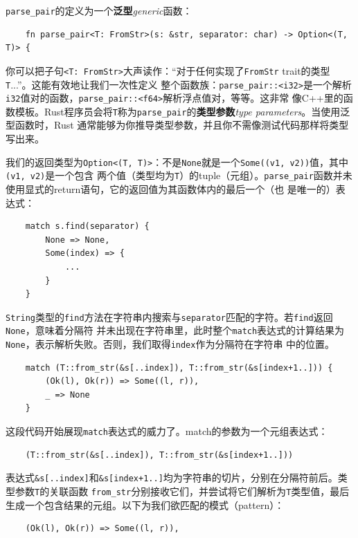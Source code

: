 \smallskip
\texttt{parse\_pair}的定义为一个\textbf{泛型}\textit{generic}函数：
\begin{verbatim}
    fn parse_pair<T: FromStr>(s: &str, separator: char) -> Option<(T, T)> {
\end{verbatim}

\smallskip
你可以把子句\texttt{<T: FromStr>}大声读作：“对于任何实现了\texttt{FromStr} trait的类型\texttt{T}...”。这能有效地让我们一次性定义
整个函数族：\texttt{parse\_pair::<i32>}是一个解析\texttt{i32}值对的函数，\texttt{parse\_pair::<f64>}解析浮点值对，等等。这非常
像C++里的函数模板。Rust程序员会将\texttt{T}称为\texttt{parse\_pair}的\textbf{类型参数}\textit{type parameters}。当使用泛型函数时，Rust
通常能够为你推导类型参数，并且你不需像测试代码那样将类型写出来。

\medskip
我们的返回类型为\texttt{Option<(T, T)>}：不是\texttt{None}就是一个\texttt{Some((v1, v2))}值，其中\texttt{(v1, v2)}是一个包含
两个值（类型均为\texttt{T}）的tuple（元组）。\texttt{parse\_pair}函数并未使用显式的return语句，它的返回值为其函数体内的最后一个（也
是唯一的）表达式：
\begin{verbatim}
    match s.find(separator) {
        None => None,
        Some(index) => {
            ...
        }
    }
\end{verbatim}

\smallskip
\texttt{String}类型的\texttt{find}方法在字符串内搜索与\texttt{separator}匹配的字符。若\texttt{find}返回\texttt{None}，意味着分隔符
并未出现在字符串里，此时整个\texttt{match}表达式的计算结果为\texttt{None}，表示解析失败。否则，我们取得\texttt{index}作为分隔符在字符串
中的位置。
\begin{verbatim}
    match (T::from_str(&s[..index]), T::from_str(&s[index+1..])) {
        (Ok(l), Ok(r)) => Some((l, r)),
        _ => None
    }
\end{verbatim}

\smallskip
这段代码开始展现\texttt{match}表达式的威力了。match的参数为一个元组表达式：
\begin{verbatim}
    (T::from_str(&s[..index]), T::from_str(&s[index+1..]))
\end{verbatim}

\smallskip
表达式\texttt{\&s[..index]}和\texttt{\&s[index+1..]}均为字符串的切片，分别在分隔符前后。类型参数\texttt{T}的关联函数
\texttt{from\_str}分别接收它们，并尝试将它们解析为\texttt{T}类型值，最后生成一个包含结果的元组。以下为我们欲匹配的模式（pattern）：
\begin{verbatim}
    (Ok(l), Ok(r)) => Some((l, r)),
\end{verbatim}

